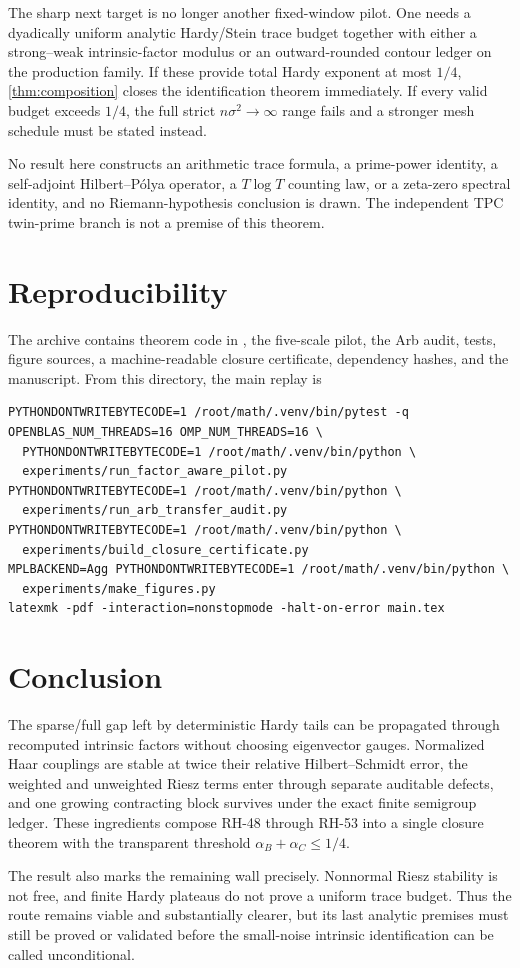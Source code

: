 \documentclass[11pt]{article}
\theoremstyle{definition}
\theoremstyle{remark}
\begin{document}
The sharp next target is no longer another fixed-window pilot.  One needs a
dyadically uniform analytic Hardy/Stein trace budget together with either a
strong--weak intrinsic-factor modulus or an outward-rounded contour ledger
on the production family.  If these provide total Hardy exponent at most
$1/4$, \cref{thm:composition} closes the identification theorem immediately.
If every valid budget exceeds $1/4$, the full strict $n\sigma^2\to\infty$
range fails and a stronger mesh schedule must be stated instead.

No result here constructs an arithmetic trace formula, a prime-power
identity, a self-adjoint Hilbert--P\'olya operator, a $T\log T$ counting law,
or a zeta-zero spectral identity, and no Riemann-hypothesis conclusion is
drawn.  The independent TPC twin-prime branch is not a premise of this
theorem.

\section{Reproducibility}

The archive contains theorem code in , the
five-scale pilot, the Arb audit, tests, figure sources, a machine-readable
closure certificate, dependency hashes, and the manuscript.  From this
directory, the main replay is
\begin{verbatim}
PYTHONDONTWRITEBYTECODE=1 /root/math/.venv/bin/pytest -q
OPENBLAS_NUM_THREADS=16 OMP_NUM_THREADS=16 \
  PYTHONDONTWRITEBYTECODE=1 /root/math/.venv/bin/python \
  experiments/run_factor_aware_pilot.py
PYTHONDONTWRITEBYTECODE=1 /root/math/.venv/bin/python \
  experiments/run_arb_transfer_audit.py
PYTHONDONTWRITEBYTECODE=1 /root/math/.venv/bin/python \
  experiments/build_closure_certificate.py
MPLBACKEND=Agg PYTHONDONTWRITEBYTECODE=1 /root/math/.venv/bin/python \
  experiments/make_figures.py
latexmk -pdf -interaction=nonstopmode -halt-on-error main.tex
\end{verbatim}

\section{Conclusion}

The sparse/full gap left by deterministic Hardy tails can be propagated
through recomputed intrinsic factors without choosing eigenvector gauges.
Normalized Haar couplings are stable at twice their relative
Hilbert--Schmidt error, the weighted and unweighted Riesz terms enter through
separate auditable defects, and one growing contracting block survives under
the exact finite semigroup ledger.  These ingredients compose RH-48 through
RH-53 into a single closure theorem with the transparent threshold
$\alpha_B+\alpha_C\le1/4$.

The result also marks the remaining wall precisely.  Nonnormal Riesz
stability is not free, and finite Hardy plateaus do not prove a uniform trace
budget.  Thus the route remains viable and substantially clearer, but its
last analytic premises must still be proved or validated before the
small-noise intrinsic identification can be called unconditional.



\end{document}
